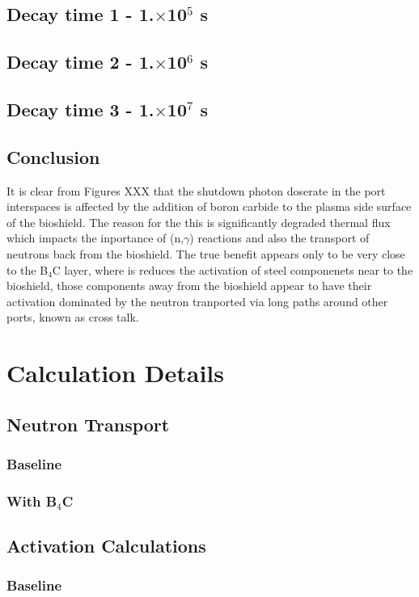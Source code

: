 \documentclass[12pt]{article}
\begin{document}
\subsection{Decay time 1 - 1.$\times$10$^5$ s}
\subsection{Decay time 2 - 1.$\times$10$^6$ s}
\subsection{Decay time 3 - 1.$\times$10$^7$ s}
\subsection{Conclusion}
It is clear from Figures XXX that the shutdown photon doserate in the port
interspaces is affected by the addition of boron carbide to the plasma side
surface of the bioshield. The reason for the this is significantly degraded
thermal flux which impacts the inportance of (n,$\gamma$) reactions and also
the transport of neutrons back from the bioshield. The true benefit appears
only to be very close to the B$_4$C layer, where is reduces the activation of
steel componenets near to the bioshield, those components away from the
bioshield appear to have their activation dominated by the neutron tranported
via long paths around other ports, known as cross talk.
\section{Calculation Details}
\subsection{Neutron Transport}
\subsubsection{Baseline}
\subsubsection{With B$_4$C}
\subsection{Activation Calculations}
\subsubsection{Baseline}
\end{document}
